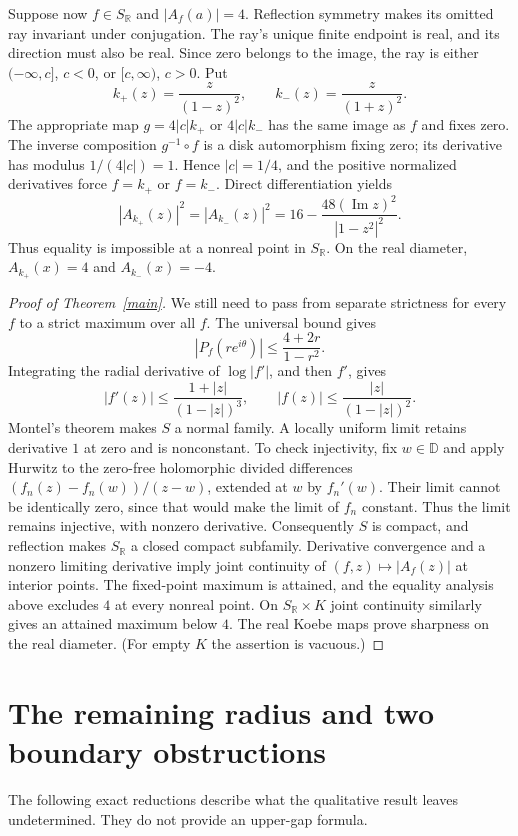 \documentclass[11pt]{article}
\newcommand{\D}{\mathbb D}
\newcommand{\SR}{S_{\mathbb R}}
\DeclareMathOperator{\Impart}{Im}
\begin{document}
Suppose now $f\in\SR$ and $|A_f(a)|=4$. Reflection symmetry makes its omitted
ray invariant under conjugation. The ray's unique finite endpoint is real,
and its direction must also be real. Since zero belongs to the image, the
ray is either $(-\infty,c]$, $c<0$, or $[c,\infty)$, $c>0$.
Put
\[
 k_+(z)=\frac{z}{(1-z)^2},\qquad k_-(z)=\frac{z}{(1+z)^2}.
\]
The appropriate map $g=4|c|k_+$ or $4|c|k_-$ has the same image as $f$ and
fixes zero. The inverse composition $g^{-1}\circ f$ is a disk automorphism
fixing zero; its derivative has modulus $1/(4|c|)=1$. Hence $|c|=1/4$,
and the positive normalized derivatives force $f=k_+$ or $f=k_-$.
Direct differentiation yields
\begin{equation}\label{deficit}
 |A_{k_+}(z)|^2=|A_{k_-}(z)|^2
 =16-\frac{48(\Impart z)^2}{|1-z^2|^2}.
\end{equation}
Thus equality is impossible at a nonreal point in $\SR$. On the real diameter,
$A_{k_+}(x)=4$ and $A_{k_-}(x)=-4$.

\begin{proof}[Proof of Theorem~\ref{main}]
We still need to pass from separate strictness for every $f$ to a strict
maximum over all $f$. The universal bound gives
\[
 |P_f(re^{i\theta})|\le\frac{4+2r}{1-r^2}.
\]
Integrating the radial derivative of $\log|f'|$, and then $f'$, gives
\[
 |f'(z)|\le\frac{1+|z|}{(1-|z|)^3},\qquad
 |f(z)|\le\frac{|z|}{(1-|z|)^2}.
\]
Montel's theorem makes $S$ a normal family. A locally uniform limit retains
derivative $1$ at zero and is nonconstant. To check injectivity, fix $w\in\D$
and apply Hurwitz to the zero-free holomorphic divided differences
$(f_n(z)-f_n(w))/(z-w)$, extended at $w$ by $f_n'(w)$.
Their limit cannot be identically zero, since that would make the limit of
$f_n$ constant. Thus the limit remains injective, with nonzero derivative.
Consequently $S$ is compact, and reflection makes $\SR$ a closed compact
subfamily. Derivative convergence and a nonzero limiting derivative imply
joint continuity of $(f,z)\mapsto|A_f(z)|$ at interior points.
The fixed-point maximum is attained, and the equality analysis above excludes
$4$ at every nonreal point. On $\SR\times K$ joint continuity similarly
gives an attained maximum below $4$. The real Koebe maps prove sharpness on
the real diameter. (For empty $K$ the assertion is vacuous.)
\end{proof}

\section{The remaining radius and two boundary obstructions}
The following exact reductions describe what the qualitative result leaves
undetermined. They do not provide an upper-gap formula.
\end{document}
